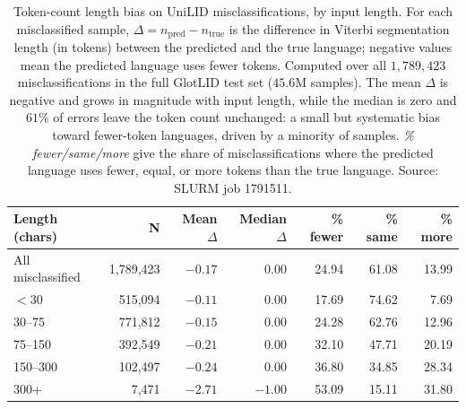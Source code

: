 \begin{table}[htbp]
\centering
\small
\begin{tabular}{lrrrrrr}
\toprule
\textbf{Length (chars)} & \textbf{N} & \textbf{Mean $\Delta$} & \textbf{Median $\Delta$} & \textbf{\% fewer} & \textbf{\% same} & \textbf{\% more} \\
\midrule
All misclassified & 1,789,423 & $-0.17$ & $0.00$ & 24.94 & 61.08 & 13.99 \\
\midrule
$<$30    &   515,094 & $-0.11$ & $0.00$ & 17.69 & 74.62 &  7.69 \\
30--75   &   771,812 & $-0.15$ & $0.00$ & 24.28 & 62.76 & 12.96 \\
75--150  &   392,549 & $-0.21$ & $0.00$ & 32.10 & 47.71 & 20.19 \\
150--300 &   102,497 & $-0.24$ & $0.00$ & 36.80 & 34.85 & 28.34 \\
300+     &     7,471 & $-2.71$ & $-1.00$ & 53.09 & 15.11 & 31.80 \\
\bottomrule
\end{tabular}
\caption{%
  Token-count length bias on UniLID misclassifications, by input length.
  For each misclassified sample, $\Delta = n_{\mathrm{pred}} - n_{\mathrm{true}}$ is the
  difference in Viterbi segmentation length (in tokens) between the predicted and the true
  language; negative values mean the predicted language uses fewer tokens. Computed over all
  $1{,}789{,}423$ misclassifications in the full GlotLID test set ($45.6$M samples). The mean
  $\Delta$ is negative and grows in magnitude with input length, while the median is zero and
  $61\%$ of errors leave the token count unchanged: a small but systematic bias toward
  fewer-token languages, driven by a minority of samples. \emph{\% fewer/same/more} give the
  share of misclassifications where the predicted language uses fewer, equal, or more tokens
  than the true language. Source: SLURM job 1791511.%
}
\label{tab:lenbias-delta}
\end{table}

